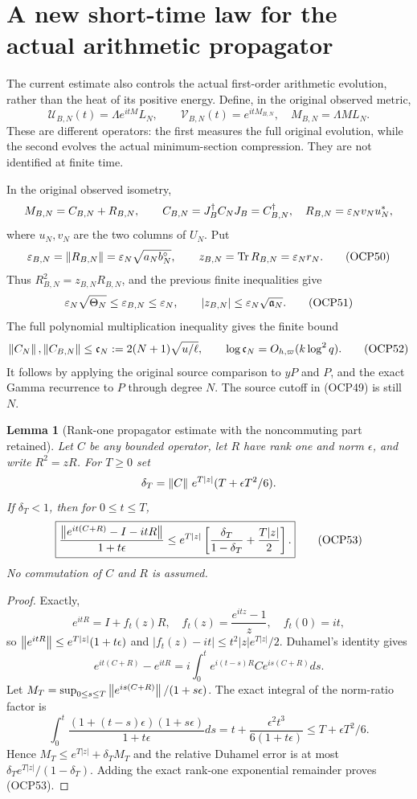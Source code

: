 \documentclass[10pt]{article}
\newtheorem{lemma}[theorem]{Lemma}
\begin{document}
\section{A new short-time law for the actual arithmetic propagator}
The current estimate also controls the actual first-order arithmetic evolution, rather than the heat of its positive energy. Define, in the original observed metric,
\[
 \mathscr U_{B,N}(t)=\Lambda e^{itM}L_N,
 \qquad \mathscr V_{B,N}(t)=e^{itM_{B,N}},
 \quad M_{B,N}=\Lambda ML_N.
 \tag{OCP49}
\]
These are different operators: the first measures the full original evolution, while the second evolves the actual minimum-section compression. They are not identified at finite time.

In the original observed isometry,
\[
 M_{B,N}=C_{B,N}+R_{B,N},\qquad
 C_{B,N}=J_B^\dagger C_NJ_B=C_{B,N}^\dagger,
 \quad R_{B,N}=\varepsilon_N v_Nu_N^*,
\]
where $u_N,v_N$ are the two columns of $U_N$. Put
\[
 \varepsilon_{B,N}=\left\lVert R_{B,N}\right\rVert
 =\varepsilon_N\sqrt{a_Nb_N^{\circ}},\qquad
 z_{B,N}=\operatorname{Tr} R_{B,N}=\varepsilon_Nr_N.
 \tag{OCP50}
\]
Thus $R_{B,N}^2=z_{B,N}R_{B,N}$, and the previous finite inequalities give
\[
 \varepsilon_N\sqrt{\Theta_N}\le\varepsilon_{B,N}\le\varepsilon_N,
 \qquad |z_{B,N}|\le\varepsilon_N\sqrt{\mathfrak a_N}.
 \tag{OCP51}
\]
The full polynomial multiplication inequality gives the finite bound
\[
 \left\lVert C_N\right\rVert,\left\lVert C_{B,N}\right\rVert\le
 \mathfrak c_N:=2(N+1)\sqrt{u/\ell},\qquad
 \log\mathfrak c_N=O_{h,\varpi}(k\log^2q).
 \tag{OCP52}
\]
It follows by applying the original source comparison to $yP$ and $P$, and the exact Gamma recurrence to $P$ through degree $N$. The source cutoff in (OCP49) is still $N$.

\begin{lemma}[Rank-one propagator estimate with the noncommuting part retained]
Let $C$ be any bounded operator, let $R$ have rank one and norm $\epsilon$, and write $R^2=zR$. For $T\ge0$ set
\[
 \delta_T=\left\lVert C\right\rVert\,e^{T|z|}(T+\epsilon T^2/6).
\]
If $\delta_T<1$, then for $0\le t\le T$,
\[
 \boxed{
 \frac{\left\lVert e^{it(C+R)}-I-itR\right\rVert}{1+t\epsilon}
 \le e^{T|z|}\left[
 \frac{\delta_T}{1-\delta_T}+\frac{T|z|}{2}\right].}
 \tag{OCP53}
\]
No commutation of $C$ and $R$ is assumed.
\end{lemma}
\begin{proof}
Exactly,
\[
 e^{itR}=I+f_t(z)R,\quad
 f_t(z)=\frac{e^{itz}-1}{z},\quad f_t(0)=it,
\]
so $\left\lVert e^{itR}\right\rVert\le e^{T|z|}(1+t\epsilon)$ and
$|f_t(z)-it|\le t^2|z|e^{T|z|}/2$.
Duhamel's identity gives
\[
 e^{it(C+R)}-e^{itR}
 =i\int_0^t e^{i(t-s)R}C e^{is(C+R)}ds.
\]
Let $M_T=\sup_{0\le s\le T}\left\lVert e^{is(C+R)}\right\rVert/(1+s\epsilon)$. The exact integral of the norm-ratio factor is
\[
 \int_0^t\frac{(1+(t-s)\epsilon)(1+s\epsilon)}{1+t\epsilon}ds
 =t+\frac{\epsilon^2t^3}{6(1+t\epsilon)}
 \le T+\epsilon T^2/6.
\]
Hence $M_T\le e^{T|z|}+\delta_TM_T$ and the relative Duhamel error is at most $\delta_Te^{T|z|}/(1-\delta_T)$. Adding the exact rank-one exponential remainder proves (OCP53).
\end{proof}
\end{document}
